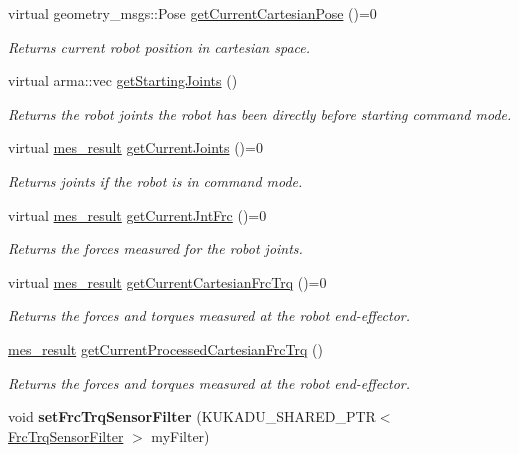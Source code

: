 \begin{DoxyCompactItemize}
virtual geometry\+\_\+msgs\+::\+Pose \hyperlink{classkukadu_1_1ControlQueue_a9e79e1d0d9697bbf146d66a2d01fea9e}{get\+Current\+Cartesian\+Pose} ()=0
\begin{DoxyCompactList}\small\item\em Returns current robot position in cartesian space. \end{DoxyCompactList}\item 
virtual arma\+::vec \hyperlink{classkukadu_1_1ControlQueue_a53b2ecff4ae71b1e01d18793f63645ce}{get\+Starting\+Joints} ()
\begin{DoxyCompactList}\small\item\em Returns the robot joints the robot has been directly before starting command mode. \end{DoxyCompactList}\item 
virtual \hyperlink{structmes__result}{mes\+\_\+result} \hyperlink{classkukadu_1_1ControlQueue_a6ba7b6db5099073eadd7bc04792bc643}{get\+Current\+Joints} ()=0
\begin{DoxyCompactList}\small\item\em Returns joints if the robot is in command mode. \end{DoxyCompactList}\item 
virtual \hyperlink{structmes__result}{mes\+\_\+result} \hyperlink{classkukadu_1_1ControlQueue_a1468c1771ea7dfd1ee3b0a7279407241}{get\+Current\+Jnt\+Frc} ()=0
\begin{DoxyCompactList}\small\item\em Returns the forces measured for the robot joints. \end{DoxyCompactList}\item 
virtual \hyperlink{structmes__result}{mes\+\_\+result} \hyperlink{classkukadu_1_1ControlQueue_aa557f386f03cfb4986ed7cd9997212ab}{get\+Current\+Cartesian\+Frc\+Trq} ()=0
\begin{DoxyCompactList}\small\item\em Returns the forces and torques measured at the robot end-\/effector. \end{DoxyCompactList}\item 
\hyperlink{structmes__result}{mes\+\_\+result} \hyperlink{classkukadu_1_1ControlQueue_a628e24bfc98b784259f77c231dee6e69}{get\+Current\+Processed\+Cartesian\+Frc\+Trq} ()
\begin{DoxyCompactList}\small\item\em Returns the forces and torques measured at the robot end-\/effector. \end{DoxyCompactList}\item 
void {\bfseries set\+Frc\+Trq\+Sensor\+Filter} (K\+U\+K\+A\+D\+U\+\_\+\+S\+H\+A\+R\+E\+D\+\_\+\+P\+TR$<$ \hyperlink{classkukadu_1_1FrcTrqSensorFilter}{Frc\+Trq\+Sensor\+Filter} $>$ my\+Filter)\hypertarget{classkukadu_1_1ControlQueue_a4d468cb85f69c7c6dfd345f72d5b1473}{}\label{classkukadu_1_1ControlQueue_a4d468cb85f69c7c6dfd345f72d5b1473}


\end{DoxyCompactItemize}
